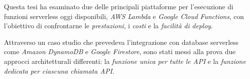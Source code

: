 Questa tesi ha esaminato due delle principali piattaforme per l’esecuzione di funzioni serverless oggi disponibili, \textit{AWS Lambda} e \textit{Google Cloud Functions}, con l’obiettivo di confrontarne le \textit{prestazioni}, i \textit{costi} e la \textit{facilità di deploy}. 

Attraverso un caso studio che prevedeva l'integrazione con database serverless come \textit{Amazon DynamoDB} e \textit{Google Firestore}, sono stati messi alla prova due approcci architetturali differenti: la \textit{funzione unica per tutte le API} e la \textit{funzione dedicata per ciascuna chiamata API}.